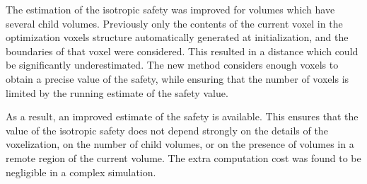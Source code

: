The estimation of the isotropic safety was improved for volumes which have 
several child volumes.  Previously only the contents of the current voxel in 
the optimization voxels structure automatically generated at initialization, 
and the boundaries of that voxel were considered.  This resulted in a distance
which could be significantly underestimated.  The new method considers enough 
voxels to obtain a precise value of the safety, while ensuring that the number 
of voxels is limited by the running estimate of the safety value.

As a result, an improved estimate of the safety is available.  This ensures 
that the value of the isotropic safety does not depend strongly on the details
of the voxelization, on the number of child volumes, or on the presence of 
volumes in a remote region of the current volume.  The extra computation cost 
was found to be negligible in a complex simulation.

